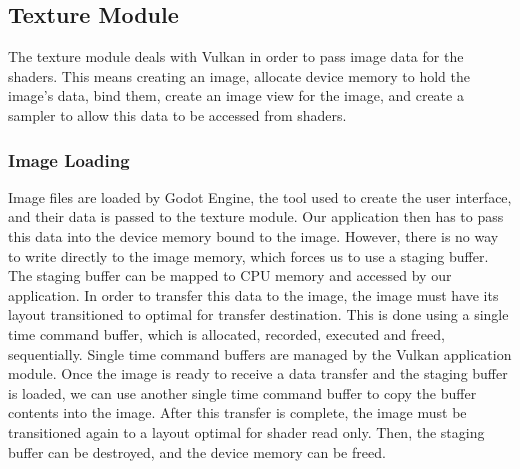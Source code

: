 \subsection{Texture Module}
The texture module deals with Vulkan in order to pass image data for the shaders. This means creating an image, allocate device memory to hold the image's data, bind them, create an image view for the image, and create a sampler to allow this data to be accessed from shaders.

\subsubsection{Image Loading}
Image files are loaded by Godot Engine, the tool used to create the user interface, and their data is passed to the texture module. Our application then has to pass this data into the device memory bound to the image. However, there is no way to write directly to the image memory, which forces us to use a staging buffer. The staging buffer can be mapped to CPU memory and accessed by our application. In order to transfer this data to the image, the image must have its layout transitioned to optimal for transfer destination. This is done using a single time command buffer, which is allocated, recorded, executed and freed, sequentially. Single time command buffers are managed by the Vulkan application module. Once the image is ready to receive a data transfer and the staging buffer is loaded, we can use another single time command buffer to copy the buffer contents into the image. After this transfer is complete, the image must be transitioned again to a layout optimal for shader read only. Then, the staging buffer can be destroyed, and the device memory can be freed.
